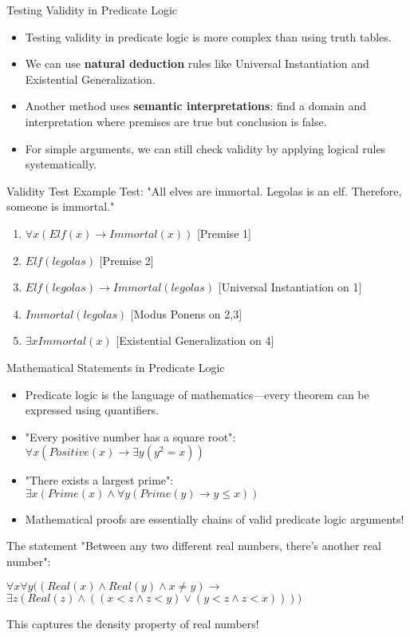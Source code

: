 \documentclass{beamer}
\begin{document}
	\begin{frame}{Testing Validity in Predicate Logic}
		\begin{itemize}
			\item Testing validity in predicate logic is more complex than using truth tables.
			\item We can use \textbf{natural deduction} rules like Universal Instantiation and Existential Generalization.
			\item Another method uses \textbf{semantic interpretations}: find a domain and interpretation where premises are true but conclusion is false.
			\item For simple arguments, we can still check validity by applying logical rules systematically.
		\end{itemize}
		
		\begin{alertblock}{Validity Test Example}
			\scriptsize
			Test: "All elves are immortal. Legolas is an elf. Therefore, someone is immortal."
			\begin{enumerate}
				\item $\forall x (Elf(x) \rightarrow Immortal(x))$ [Premise 1]
				\item $Elf(legolas)$ [Premise 2]
				\item $Elf(legolas) \rightarrow Immortal(legolas)$ [Universal Instantiation on 1]
				\item $Immortal(legolas)$ [Modus Ponens on 2,3]
				\item $\exists x Immortal(x)$ [Existential Generalization on 4] \checkmark
			\end{enumerate}
		\end{alertblock}
	\end{frame}
	
	\begin{frame}{Mathematical Statements in Predicate Logic}
		\begin{itemize}
			\item Predicate logic is the language of mathematics—every theorem can be expressed using quantifiers.
			\item "Every positive number has a square root": $\forall x (Positive(x) \rightarrow \exists y (y^2 = x))$
			\item "There exists a largest prime": $\exists x (Prime(x) \wedge \forall y (Prime(y) \rightarrow y \leq x))$
			\item Mathematical proofs are essentially chains of valid predicate logic arguments!
		\end{itemize}
		
		\begin{example}
			The statement "Between any two different real numbers, there's another real number":
			\begin{center}
				$\forall x \forall y ((Real(x) \wedge Real(y) \wedge x \neq y) \rightarrow$\\
				$\exists z (Real(z) \wedge ((x < z \wedge z < y) \vee (y < z \wedge z < x))))$
			\end{center}
			This captures the density property of real numbers!
		\end{example}
	\end{frame}
	
\end{document}
